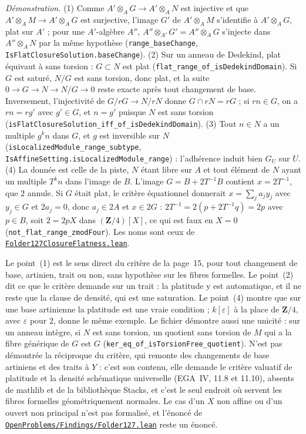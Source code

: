 {\small \emph{Démonstration.} (1) Comme $A' \otimes_A G \to A' \otimes_A N$ est injective et que $A' \otimes_A M \to A' \otimes_A G$ est surjective, l'image $G'$ de $A' \otimes_A M$ s'identifie à $A' \otimes_A G$, plat sur $A'$ ; pour une $A'$-algèbre $A''$, $A'' \otimes_{A'} G' = A'' \otimes_A G$ s'injecte dans $A'' \otimes_A N$ par la même hypothèse (\texttt{range\_baseChange}, \texttt{IsFlatClosureSolution.\allowbreak{}baseChange}). (2) Sur un anneau de Dedekind, plat équivaut à sans torsion : $G \subset N$ est plat (\texttt{flat\_range\_of\_isDedekindDomain}). Si $G$ est saturé, $N/G$ est sans torsion, donc plat, et la suite $0 \to G \to N \to N/G \to 0$ reste exacte après tout changement de base. Inversement, l'injectivité de $G/rG \to N/rN$ donne $G \cap rN = rG$ ; si $rn \in G$, on a $rn = rg'$ avec $g' \in G$, et $n = g'$ puisque $N$ est sans torsion (\texttt{isFlatClosureSolution\_iff\_of\_isDedekindDomain}). (3) Tout $n \in N$ a un multiple $g^k n$ dans $G$, et $g$ est inversible sur $N$ (\texttt{isLocalizedModule\_range\_subtype}, \texttt{IsAffineSetting.\allowbreak{}isLocalizedModule\_range}) : l'adhérence induit bien $G_U$ sur $U$. (4) La donnée est celle de la piste, $N$ étant libre sur $A$ et tout élément de $N$ ayant un multiple $T^k n$ dans l'image de $B$. L'image $G = B + 2T^{-1}B$ contient $x = 2T^{-1}$, que $2$ annule. Si $G$ était plat, le critère équationnel donnerait $x = \sum_j a_j y_j$ avec $y_j \in G$ et $2a_j = 0$, donc $a_j \in 2A$ et $x \in 2G$ : $2T^{-1} = 2(p + 2T^{-1}q) = 2p$ avec $p \in B$, soit $2 = 2pX$ dans $(\mathbf Z/4)[X]$, ce qui est faux en $X = 0$ (\texttt{not\_flat\_range\_zmodFour}). Les noms sont ceux de \href{\leanblobmain/AlgebraicGeometry/Folder127ClosureFlatness.lean}{\texttt{Folder127ClosureFlatness.\allowbreak{}lean}}.

Le point~(1) est le sens direct du critère de la page~15, pour tout changement de base, artinien, trait ou non, sans hypothèse sur les fibres formelles. Le point~(2) dit ce que le critère demande sur un trait : la platitude y est automatique, et il ne reste que la clause de densité, qui est une saturation. Le point~(4) montre que sur une base artinienne la platitude est une vraie condition ; $k[\varepsilon]$ à la place de $\mathbf Z/4$, avec $\varepsilon$ pour $2$, donne le même exemple. Le fichier démontre aussi une unicité : sur un anneau intègre, si $N$ est sans torsion, un quotient sans torsion de $M$ qui a la fibre générique de $G$ est $G$ (\texttt{ker\_eq\_of\_isTorsionFree\_quotient}). N'est pas démontrée la réciproque du critère, qui remonte des changements de base artiniens et des traits à $Y$ : c'est son contenu, elle demande le critère valuatif de platitude et la densité schématique universelle (EGA~IV, 11.8 et 11.10), absents de mathlib et de la bibliothèque Stacks, et c'est le seul endroit où servent les fibres formelles géométriquement normales. Le cas d'un $X$ non affine ou d'un ouvert non principal n'est pas formalisé, et l'énoncé de \href{https://github.com/Commutator-IO/GrothendieckArchivesProofs/blob/main/OpenProblems/Findings/Folder127.lean}{\texttt{OpenProblems/\allowbreak{}Findings/\allowbreak{}Folder127.\allowbreak{}lean}} reste un énoncé.\par}

